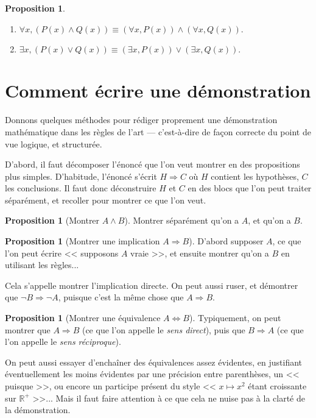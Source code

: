 \documentclass[11pt]{article}
\newcommand{\R}{\mathbb R}
\theoremstyle{definition}
\newtheorem{prop}[defn]{Proposition}
\theoremstyle{remark}
\begin{document}
\begin{prop}\leavevmode
	\begin{enumerate}
		\item $\forall x,(P(x)\land Q(x))\equiv (\forall x,P(x))\land (\forall x,Q(x)) $.
		\item $\exists x,(P(x)\lor Q(x))\equiv (\exists x,P(x))\lor(\exists x,Q(x)). $
	\end{enumerate}
\end{prop}



\section{Comment écrire une démonstration}

Donnons quelques méthodes pour rédiger proprement une démonstration mathématique dans les règles de l'art — c'est-à-dire de façon correcte du point de vue logique, et structurée.

D'abord, il faut décomposer l'énoncé que l'on veut montrer en des propositions plus simples. D'habitude, l'énoncé s'écrit $H\Rightarrow C$
où $H$ contient les hypothèses, $C$ les conclusions. Il faut donc déconstruire $H$ et $C$ en des blocs que l'on peut traiter séparément, et recoller pour montrer ce que l'on veut.

\begin{prop}[Montrer $A\land B$]
	Montrer séparément qu'on a $A$, et qu'on a $B$.
\end{prop}

\begin{prop}[Montrer une implication $A\Rightarrow B$]
	
	
	D'abord supposer $A$, ce que l'on peut écrire << supposons $A$ vraie >>, et ensuite montrer qu'on a $B$ en utilisant les règles...

	Cela s'appelle montrer l'implication directe. On peut aussi ruser, et démontrer que $\neg B\Rightarrow \neg A$, puisque c'est la même chose que $A\Rightarrow B$.
\end{prop}

\begin{prop}[Montrer une équivalence $A\Leftrightarrow B$]
	
	
	Typiquement, on peut montrer que $A\Rightarrow B$ (ce que l'on appelle le \textit{sens direct}), puis que $B\Rightarrow A$ (ce que l'on appelle le \textit{sens réciproque}).
	
	On peut aussi essayer d'enchaîner des équivalences assez évidentes, en justifiant éventuellement les moins évidentes par une précision entre parenthèses, un << puisque >>, ou encore un participe présent du style << $x\longmapsto x^2$ étant croissante sur $\R^+$ >>... Mais il faut faire attention à ce que cela ne nuise pas à la clarté de la démonstration.
\end{prop}
\end{document}
